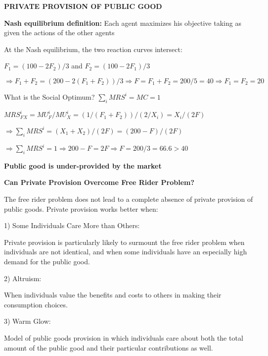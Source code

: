 \documentclass[landscape]{slides}
\begin{document}
\begin{slide}
\begin{center}
{\bf PRIVATE PROVISION OF PUBLIC GOOD}
\end{center}

\textbf{Nash equilibrium definition:} Each agent maximizes his objective
taking as given the actions of the other agents

At the Nash equilibrium, the two reaction curves intersect:

$F_1=(100-2F_2)/3$ and $F_2=(100-2F_1)/3$

$\Rightarrow F_1+F_2=(200-2(F_1+F_2))/3 \Rightarrow F=F_1+F_2=200/5=40 \Rightarrow F_1=F_2=20$

What is the Social Optimum? $\sum_i MRS^i = MC = 1$

$MRS_{FX}^i= MU^i_F/MU^i_X = (1/(F_1+F_2)) / (2/X_i) = X_i/(2F)$

$\Rightarrow \sum_i MRS^i = (X_1+X_2)/(2F)=(200-F)/(2 F)$

$\Rightarrow \sum_i MRS^i = 1 \Rightarrow 200-F=2F \Rightarrow F=200/3=66.6 > 40$

\textbf{Public good is under-provided by the market}

\end{slide}




\begin{slide}
\begin{center}
{\bf Can Private Provision Overcome Free Rider Problem?}
\end{center}
The free rider problem does not lead to a complete absence of private provision of public goods.
Private provision works better when:

1) Some Individuals Care More than Others:

\small
Private provision is particularly likely to surmount the free rider problem when individuals are not identical, and when some individuals have an especially high demand for the public good.

\normalsize
2) Altruism:

\small
When individuals value the benefits and costs to others in making their consumption choices.
\normalsize

3) Warm Glow:

\small
Model of public goods provision in which individuals care about both the total amount of the public good and their particular contributions as well.

\end{slide}
\end{document}
